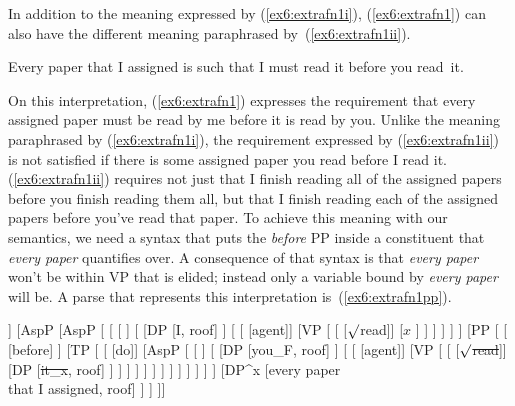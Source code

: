 In addition to the meaning expressed by (\ref{ex6:extrafn1i}), (\ref{ex6:extrafn1}) can also have the different meaning paraphrased by~(\ref{ex6:extrafn1ii}).
\begin{exe}
\raggedright
	\ex \label{ex6:extrafn1ii}
	Every paper that I assigned is such that I must read it before you read~it.
\end{exe}
On this interpretation, (\ref{ex6:extrafn1}) expresses the requirement that every assigned paper must be read by me before it is read by you. Unlike the meaning paraphrased by (\ref{ex6:extrafn1i}), the requirement expressed by (\ref{ex6:extrafn1ii}) is not satisfied if there is some assigned paper you read before I read it. (\ref{ex6:extrafn1ii}) requires not just that I finish reading all of the assigned papers before you finish reading them all, but that I finish reading each of the assigned papers before you've read that paper. To achieve this meaning with our semantics, we need a syntax that puts the \emph{before} PP inside a constituent that \emph{every paper} quantifies over. A consequence of that syntax is that \emph{every paper} won't be within VP that is elided; instead only a variable bound by \emph{every paper} will be. A parse that represents this interpretation is~(\ref{ex6:extrafn1pp}).
\medskip
\begin{fullwidth}
\begin{exe}
\raggedright
	\ex \label{ex6:extrafn1pp}
	\footnotesize
\begin{forest}
[TP [\ibar{T}
	[\obar{T} [must]]
	[AspP
		[AspP [
			[
				[ ]
				[
					[DP [I, roof] ]
					[
						[ [agent]]
						[VP [
							[ [$\surd$read]]
							[$x$ ]
						] ]
					 ]
				 ]
			 ]
			[PP [
				[ [before] ]
				[TP [
					[ [do]]
					[AspP [
						[ ]
						[
							[DP [you_F, roof] ]
							[
								[ [agent]]
								[VP [
									[ [\sout{$\surd$read}]]
									[DP [\sout{it_x}, roof] ]
								] ]
							 ]
						 ]
					] ]
				] ]
			] ]
		] ]
		[DP^x [every paper\\ that I assigned, roof] ]
	 ]
]]
\end{forest}
\end{exe}
\end{fullwidth}
\medskip
